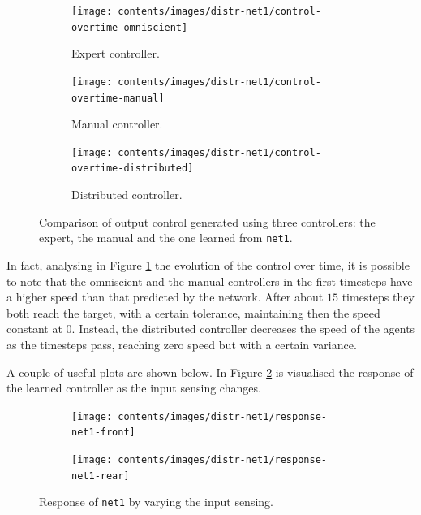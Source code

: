 \begin{figure}[!htb]
	\centering
	\begin{subfigure}[h]{0.3\textwidth}
		\centering
		\texttt{[image: contents/images/distr-net1/control-overtime-omniscient]}%
		\caption{Expert controller.}
	\end{subfigure}
	\hfill
	\begin{subfigure}[h]{0.3\textwidth}
		\centering
		\texttt{[image: contents/images/distr-net1/control-overtime-manual]}%
		\caption{Manual controller.}
	\end{subfigure}
	\hfill
	\begin{subfigure}[h]{0.3\textwidth}
		\centering
		\texttt{[image: contents/images/distr-net1/control-overtime-distributed]}
		\caption{Distributed controller.}
	\end{subfigure}
	\caption[Evaluation of the control learned by \texttt{net1}.]{Comparison 
		of output control generated using three controllers: the expert, the manual 
		and the one learned from \texttt{net1}.}
	\label{fig:net1control}
\end{figure}

In fact, analysing in Figure \ref{fig:net1control} the evolution of the control over 
time, it is possible to note that the omniscient and the manual controllers in the 
first timesteps have a higher speed than that predicted by the network. After 
about $15$ timesteps they both reach the target, with a certain tolerance, 
maintaining then the speed constant at $0$. Instead, the distributed controller 
decreases the speed of the agents as the timesteps pass, reaching zero speed but 
with a certain variance.

A couple of useful plots are shown below. In Figure \ref{fig:net1responsesensors} 
is visualised the response of the learned controller as the input sensing changes. 
\begin{figure}[!htb]
	\centering
	\begin{subfigure}[h]{0.49\textwidth}
		\centering
		\texttt{[image: contents/images/distr-net1/response-net1-front]}%
	\end{subfigure}
	\hfill
	\begin{subfigure}[h]{0.49\textwidth}
		\centering
		\texttt{[image: contents/images/distr-net1/response-net1-rear]}
	\end{subfigure}
	\caption[Response of \texttt{net1} by varying the input sensing.]{Response of 
		\texttt{net1} by varying the input sensing.}
	\label{fig:net1responsesensors}
\end{figure}

